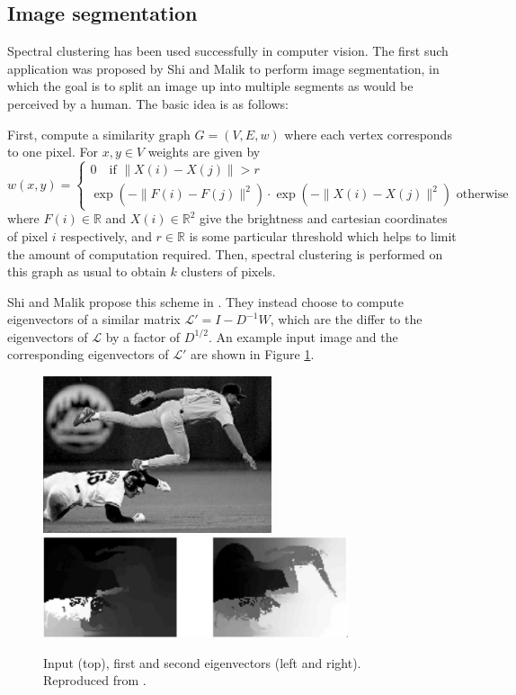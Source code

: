 \documentclass[a4paper,11pt]{article}
\theoremstyle{definition}
\newcommand{\R}{\mathbb{R}}
\renewcommand{\L}{\mathcal{L}}
\begin{document}
\subsection{Image segmentation}

Spectral clustering has been used successfully in computer vision. The first such application was proposed by Shi and Malik \cite{shimalik} to perform image segmentation, in which the goal is to split an image up into multiple segments as would be perceived by a human. The basic idea is as follows:

First, compute a similarity graph $G = (V, E, w)$ where each vertex corresponds to one pixel. For $x, y \in V$ weights are given by
\begin{equation}\label{image-segmentation-weights}
w(x, y) = \begin{cases}
0 \hspace{1em}\text{if } \|X(i) - X(j)\| > r \\
\exp\left(-\|F(i) - F(j)\|^2\right) \cdot \exp\left(-\|X(i) - X(j)\|^2 \right) \text{ otherwise}
\end{cases}
\end{equation}
where $F(i) \in \R$ and $X(i) \in \R^2$ give the brightness and cartesian coordinates of pixel $i$ respectively, and $r \in \R$ is some particular threshold which helps to limit the amount of computation required. Then, spectral clustering is performed on this graph as usual to obtain $k$ clusters of pixels.

\medskip

Shi and Malik propose this scheme in \cite{shimalik}. They instead choose to compute eigenvectors of a similar matrix $\L' = I - D^{-1}W$, which are the differ to the eigenvectors of $\L$ by a factor of $D^{1/2}$. An example input image and the corresponding eigenvectors of $\L'$ are shown in Figure \ref{shi-malik-result}.

\begin{figure}
\centering
\includegraphics[width=0.6\textwidth]{shi-malik-input} \\
\vspace{0.5cm}
\includegraphics[width=0.8\textwidth]{shi-malik-eigenvectors}
\caption{Input (top), first and second eigenvectors (left and right). Reproduced from \cite{shimalik}.}\label{shi-malik-result}
\end{figure}
\end{document}
